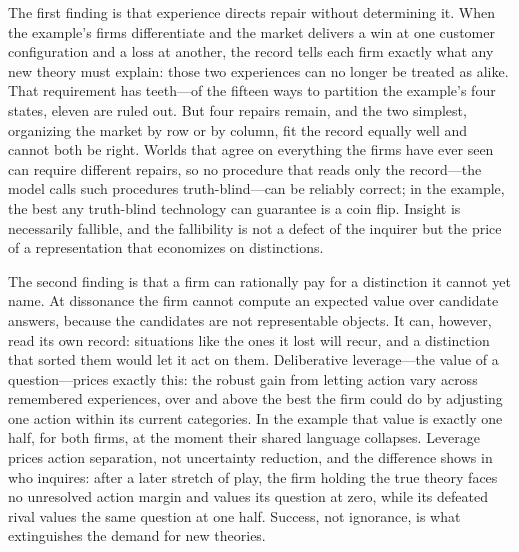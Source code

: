 \documentclass[11pt]{article}
\theoremstyle{definition}
\begin{document}
The first finding is that experience directs repair without determining it.
When the example's firms differentiate and the market delivers a win at one customer configuration and a loss at another, the record tells each firm exactly what any new theory must explain: those two experiences can no longer be treated as alike.
That requirement has teeth---of the fifteen ways to partition the example's four states, eleven are ruled out.
But four repairs remain, and the two simplest, organizing the market by row or by column, fit the record equally well and cannot both be right.
Worlds that agree on everything the firms have ever seen can require different repairs, so no procedure that reads only the record---the model calls such procedures truth-blind---can be reliably correct; in the example, the best any truth-blind technology can guarantee is a coin flip.
Insight is necessarily fallible, and the fallibility is not a defect of the inquirer but the price of a representation that economizes on distinctions.

The second finding is that a firm can rationally pay for a distinction it cannot yet name.
At dissonance the firm cannot compute an expected value over candidate answers, because the candidates are not representable objects.
It can, however, read its own record: situations like the ones it lost will recur, and a distinction that sorted them would let it act on them.
Deliberative leverage---the value of a question---prices exactly this: the robust gain from letting action vary across remembered experiences, over and above the best the firm could do by adjusting one action within its current categories.
In the example that value is exactly one half, for both firms, at the moment their shared language collapses.
Leverage prices action separation, not uncertainty reduction, and the difference shows in who inquires: after a later stretch of play, the firm holding the true theory faces no unresolved action margin and values its question at zero, while its defeated rival values the same question at one half.
Success, not ignorance, is what extinguishes the demand for new theories.
\end{document}
